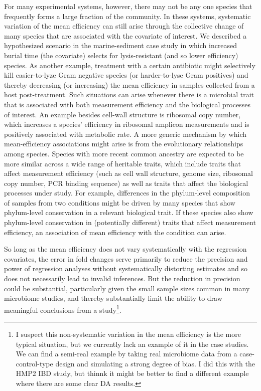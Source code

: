 \documentclass[
]{article}
\begin{document}
For many experimental systems, however, there may not be any one species that frequently forms a large fraction of the community.
In these systems, systematic variation of the mean efficiency can still arise through the collective change of many species that are associated with the covariate of interest.
We described a hypothesized scenario in the marine-sediment case study in which increased burial time (the covariate) selects for lysis-resistant (and so lower efficiency) species.
As another example, treatment with a certain antibiotic might selectively kill easier-to-lyze Gram negative species (or harder-to-lyse Gram positives) and thereby decreasing (or increasing) the mean efficiency in samples collected from a host post-treatment.
Such situations can arise whenever there is a microbial trait that is associated with both measurement efficiency and the biological processes of interest.
An example besides cell-wall structure is ribosomal copy number, which increases a species' efficiency in ribosomal amplicon measurements and is positively associated with metabolic rate.
A more generic mechanism by which mean-efficiency associations might arise is from the evolutionary relationships among species.
Species with more recent common ancestry are expected to be more similar across a wide range of heritable traits, which include traits that affect measurement efficiency (such as cell wall structure, genome size, ribosomal copy number, PCR binding sequence) as well as traits that affect the biological processes under study.
For example, differences in the phylum-level composition of samples from two conditions might be driven by many species that show phylum-level conservation in a relevant biological trait.
If these species also show phylum-level conservation in (potentially different) traits that affect measurement efficiency, an association of mean efficiency with the condition can arise.

So long as the mean efficiency does not vary systematically with the regression covariates, the error in fold changes serve primarily to reduce the precision and power of regression analyses without systematically distorting estimates and so does not necessarily lead to invalid inferences.
But the reduction in precision could be substantial, particularly given the small sample sizes common in many microbiome studies, and thereby substantially limit the ability to draw meaningful conclusions from a study\footnote{I suspect this non-systematic variation in the mean efficiency is the more typical situation, but we currently lack an example of it in the case studies. We can find a semi-real example by taking real microbiome data from a case-control-type design and simulating a strong degree of bias. I did this with the HMP2 IBD study, but thinnk it might be better to find a different example where there are some clear DA results.}.
\end{document}
